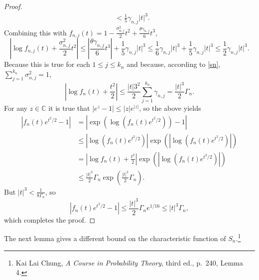 \documentclass{article}
\theoremstyle{definition}
\theoremstyle{definition}
\begin{document}
\begin{proof}
\begin{align*}
&<\frac{1}{5} \gamma_{n,j} |t|^3.
\end{align*}
Combining this with $f_{n,j}(t) = 1- \frac{\sigma_{n,j}^2}{2} t^2  + \frac{\theta \gamma_{n,j}}{6} t^3$,
\[
\left|\log f_{n,j}(t) + \frac{\sigma_{n,j}^2}{2}t^2 \right| \leq 
\left|\frac{\theta \gamma_{n,j}}{6} t^3 \right| +\frac{1}{5} \gamma_{n,j} |t|^3
\leq \frac{1}{6}\gamma_{n,j} |t|^3 + \frac{1}{5} \gamma_{n,j} |t|^3 \leq 
\frac{1}{2}\gamma_{n,j} |t|^3.
\]
Because this is true for each $1 \leq j \leq k_n$ and because, according to \eqref{sn}, $\sum_{j=1}^{k_n} \sigma_{n,j}^2=1$,
\[
\left|\log f_n(t) + \frac{t^2}{2} \right| \leq \frac{|t|3^2}{2} \sum_{j=1}^{k_n} \gamma_{n,j} = \frac{|t|^3}{2} \Gamma_n.
\]
For any $z \in \mathbb{C}$ it is true that $|e^z - 1| \leq |z| e^{|z|}$, so the above yields
\begin{align*}
|f_n(t) e^{t^2/2} - 1| &= |\exp(\log(f_n(t) e^{t^2/2}))-1|\\
&\leq |\log(f_n(t) e^{t^2/2})| \exp\left(\left|\log(f_n(t) e^{t^2/2})\right|\right)\\
&=\left|\log f_n(t) + \frac{t^2}{2} \right|\exp\left(\left|\log(f_n(t) e^{t^2/2})\right|\right)\\
&\leq
\frac{|t|^3}{2} \Gamma_n   \exp\left(\frac{|t|^3}{2} \Gamma_n \right).
\end{align*}
But $|t|^3 < \frac{1}{8\Gamma_n}$, so
\[
|f_n(t) e^{t^2/2} - 1|  \leq  \frac{|t|^3}{2} \Gamma_n e^{1/16}
\leq |t|^3 \Gamma_n,
\]
which completes the proof.
\end{proof}



The next lemma gives a different bound on the characteristic function of $S_n$.\footnote{Kai Lai Chung,
{\em A Course in Probability Theory}, third ed., p.~240, Lemma 4.}
\end{document}
